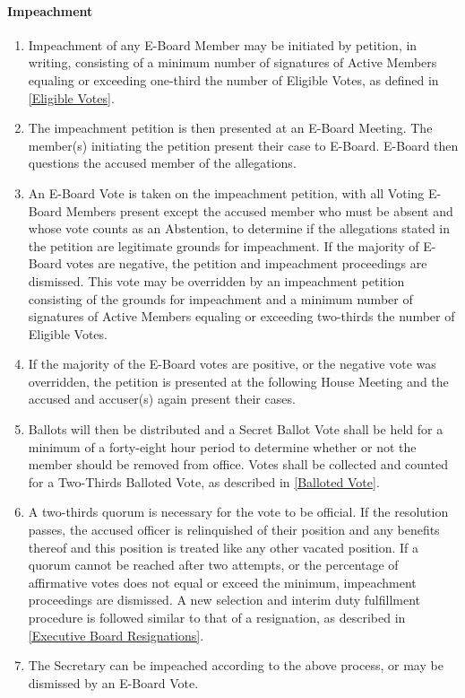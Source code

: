\documentclass{article}
\newcommand{\asubsubsection}[1]{\paragraph{#1} \label{#1}}
\begin{document}
\asubsubsection{Impeachment}
\begin{enumerate}
	\item Impeachment of any E-Board Member may be initiated by petition, in writing, consisting of a minimum number of signatures of Active Members equaling or exceeding one-third the number of Eligible Votes, as defined in \ref{Eligible Votes}.
	\item The impeachment petition is then presented at an E-Board Meeting.
	      The member(s) initiating the petition present their case to E-Board.
	      E-Board then questions the accused member of the allegations.
	\item An E-Board Vote is taken on the impeachment petition, with all Voting E-Board Members present except the accused member who must be absent and whose vote counts as an Abstention, to determine if the allegations stated in the petition are legitimate grounds for impeachment.
	      If the majority of E-Board votes are negative, the petition and impeachment proceedings are dismissed.
	      This vote may be overridden by an impeachment petition consisting of the grounds for impeachment and a minimum number of signatures of Active Members equaling or exceeding two-thirds the number of Eligible Votes.
	\item If the majority of the E-Board votes are positive, or the negative vote was overridden, the petition is presented at the following House Meeting and the accused and accuser(s) again present their cases.
	\item Ballots will then be distributed and a Secret Ballot Vote shall be held for a minimum of a forty-eight hour period to determine whether or not the member should be removed from office.
	      Votes shall be collected and counted for a Two-Thirds Balloted Vote, as described in \ref{Balloted Vote}.
	\item A two-thirds quorum is necessary for the vote to be official.
	      If the resolution passes, the accused officer is relinquished of their position and any benefits thereof and this position is treated like any other vacated position.
	      If a quorum cannot be reached after two attempts, or the percentage of affirmative votes does not equal or exceed the minimum, impeachment proceedings are dismissed.
	      A new selection and interim duty fulfillment procedure is followed similar to that of a resignation, as described in \ref{Executive Board Resignations}.
	\item The Secretary can be impeached according to the above process, or may be dismissed by an E-Board Vote.
\end{enumerate}
\end{document}
